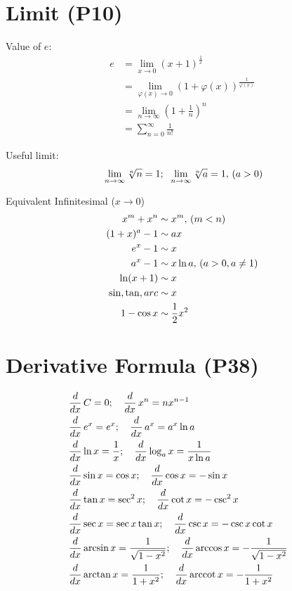 \documentclass[fleqn]{minimal}
\begin{document}
\chapter{Limit (P10)}

Value of \(e\):
\begin{equation}\tag{$e$}\label{value.e}
\begin{split}
e &= \lim_{x \rightarrow 0}(x + 1)^{\frac{1}{x}}\\
  &= \lim_{\varphi(x)\rightarrow0}(1 + \varphi(x))^{\frac{1}{\varphi(x)}}\\
  &= \lim_{n \rightarrow \infty}(1 + \frac{1}{n})^n\\
  &= \sum_{n=0}^{\infty}\frac{1}{n!}
\end{split}
\end{equation}

Useful limit:
\Creset
\begin{equation}
\relax~\lim_{n\rightarrow\infty}\sqrt[n]n = 1;\;
\relax~\lim_{n\rightarrow\infty}\sqrt[n]a = 1,\,(a > 0)
\end{equation}

Equivalent Infinitesimal ($x \rightarrow 0$)
\begin{align}
\nonumber x^m + x^n &\sim x^m,\,(m < n)\\
   (1 + x)^a - 1 &\sim ax\\
\nonumber e^x - 1 &\sim x\\
   a^x - 1 &\sim x\ln a,\,(a > 0, a \neq 1)\\
   \ln(x + 1) &\sim x \\
   \sin,\tan,arc &\sim x\\
   1 - \cos x &\sim \frac{1}{2}x^2
\end{align}

\chapter{Derivative Formula (P38)}
{\small
\begin{align}
  &\operatorname{\mathnormal{\frac{d}{dx}}} C = 0;\quad
   \operatorname{\mathnormal{\frac{d}{dx}}} x^n=nx^{n-1}&&\\
  &\operatorname{\mathnormal{\frac{d}{dx}}} e^x = e^x;\quad
   \operatorname{\mathnormal{\frac{d}{dx}}} a^x = a^x\ln a\\
  &\operatorname{\mathnormal{\frac{d}{dx}}} \ln x = \frac{1}{x};\quad
   \operatorname{\mathnormal{\frac{d}{dx}}} \log_a x = \frac{1}{x\ln{a}}\\
\nonumber&\operatorname{\mathnormal{\frac{d}{dx}}} \sin x = \cos x;\quad
   \operatorname{\mathnormal{\frac{d}{dx}}} \cos x = -\sin x\\
\nonumber&\operatorname{\mathnormal{\frac{d}{dx}}} \tan x = \sec^2x;\quad
   \operatorname{\mathnormal{\frac{d}{dx}}} \cot x = -\csc^2x\\
  &\operatorname{\mathnormal{\frac{d}{dx}}} \sec x = \sec x \tan x;\quad
   \operatorname{\mathnormal{\frac{d}{dx}}} \csc x = -\csc x \cot x\\
\nonumber&\operatorname{\mathnormal{\frac{d}{dx}}} \arcsin x = \frac{1}{\sqrt{1 - x^2}};\quad
   \operatorname{\mathnormal{\frac{d}{dx}}} \arccos x = -\frac{1}{\sqrt{1 - x^2}}\\
  &\operatorname{\mathnormal{\frac{d}{dx}}} \arctan x = \frac{1}{1 + x^2};\quad
   \operatorname{\mathnormal{\frac{d}{dx}}} \operatorname{arccot} x = -\frac{1}{1 + x^2}
\end{align}
}
\end{document}
